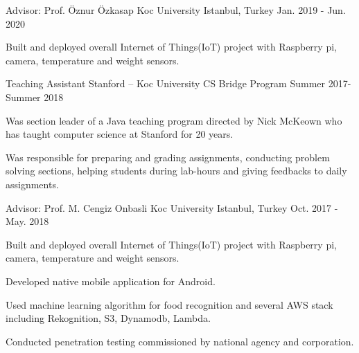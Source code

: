 \vspace{\acvSectionRemove}


\begin{cventries}
  \cventry
    {Advisor: Prof. Öznur Özkasap} %
    {Koc University} %
    {Istanbul, Turkey} %
    {Jan. 2019 - Jun. 2020} %
    {
      \begin{cvitems} %
        \item {Built and deployed overall Internet of Things(IoT) project with Raspberry pi, camera, temperature and weight sensors.  }
      \end{cvitems}
    }

  \cventry
    {Teaching Assistant } %
    {Stanford – Koc University CS Bridge Program} %
    {} %
    {Summer 2017-Summer 2018} %
    {
      \begin{cvitems} %
        \item {Was section leader of a Java teaching program directed by Nick McKeown who has taught computer science at Stanford for 20 years.}
        \item {Was responsible for preparing and grading assignments, conducting problem solving sections, helping students during lab-hours and giving feedbacks to daily assignments.}
      \end{cvitems}
    }

  \cventry
    {Advisor: Prof. M. Cengiz Onbasli} %
    {Koc University} %
    {Istanbul, Turkey} %
    {Oct. 2017 - May. 2018} %
    {
      \begin{cvitems} %
        \item {Built and deployed overall Internet of Things(IoT) project with Raspberry pi, camera, temperature and weight sensors.  }
        \item {Developed native mobile application for Android. }
       	\item {Used machine learning algorithm for food recognition and several AWS stack including Rekognition, S3, Dynamodb, Lambda.} 
        \item {Conducted penetration testing commissioned by national agency and corporation.}
      \end{cvitems}
    }


\end{cventries}
